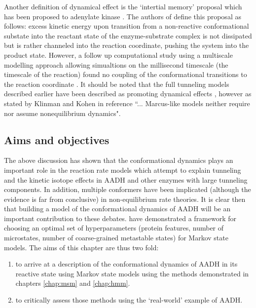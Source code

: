 Another definition of dynamical effect is the `intertial memory' proposal \cite{warshelPerspectiveDefiningQuantifying2016} which has been proposed to adenylate kinase \cite{eisenmesserIntrinsicDynamicsEnzyme2005, henzler-wildmanIntrinsicMotionsEnzymatic2007, olssonSoluteSolventDynamics2004}.  The authors of \cite{warshelPerspectiveDefiningQuantifying2016, kamerlinDawn21stCentury2010a} define this proposal as follows: excess kinetic energy upon transition from a non-reactive conformational substate into the reactant state of the enzyme-substrate complex is not dissipated but is rather channeled into the reaction coordinate, pushing the system into the product state. However, a follow up computational study using a multiscale modelling approach \cite{kamerlinMultiscaleModelingBiological2011} allowing simualtions on the millisecond timescale (the timescale of the reaction) found no coupling of the conformational transitions to the reaction coordinate \cite{pisliakovEnzymeMillisecondConformational2009}.  It should be noted that the full tunneling models described earlier have been described as promoting dynamical effects \cite{warshelPerspectiveDefiningQuantifying2016}, however as stated by Klinman and Kohen  in reference \cite{klinmanHydrogenTunnelingLinks2013} ``... Marcus-like models neither require nor assume nonequilibrium dynamics".  


\subsection{Aims and objectives}

The above discussion has shown that the conformational dynamics plays an important role in the reaction rate models which attempt to explain tunneling and the kinetic isotope effects in AADH and other enzymes with large tunneling components. In addition, multiple conformers have been implicated (although the evidence is far from conclusive) in non-equilibrium rate theories.  It is clear then that building a model of the conformational dynamics of AADH will be an important contribution to these debates.  have demonstrated a framework for choosing an optimal set of hyperparameters (protein features, number of microstates, number of coarse-grained metastable states) for Markov state models.  The aims of this chapter are thus two fold: 
\begin{enumerate}
    \item to arrive at a description of the conformational dynamics of AADH in its reactive state using Markov state models using the methods demonstrated in chapters \ref{chap:msm} and \ref{chap:hmm}. 
    \item to critically assess those methods using the `real-world' example of AADH. 
\end{enumerate}

